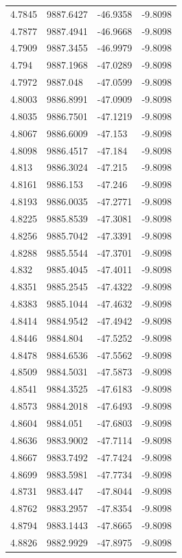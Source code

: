 \begin{table}[H]
\begin{tabular}{llll}
4.7845 & 9887.6427 & -46.9358 & -9.8098 \\
4.7877 & 9887.4941 & -46.9668 & -9.8098 \\
4.7909 & 9887.3455 & -46.9979 & -9.8098 \\
4.794 & 9887.1968 & -47.0289 & -9.8098 \\
4.7972 & 9887.048 & -47.0599 & -9.8098 \\
4.8003 & 9886.8991 & -47.0909 & -9.8098 \\
4.8035 & 9886.7501 & -47.1219 & -9.8098 \\
4.8067 & 9886.6009 & -47.153 & -9.8098 \\
4.8098 & 9886.4517 & -47.184 & -9.8098 \\
4.813 & 9886.3024 & -47.215 & -9.8098 \\
4.8161 & 9886.153 & -47.246 & -9.8098 \\
4.8193 & 9886.0035 & -47.2771 & -9.8098 \\
4.8225 & 9885.8539 & -47.3081 & -9.8098 \\
4.8256 & 9885.7042 & -47.3391 & -9.8098 \\
4.8288 & 9885.5544 & -47.3701 & -9.8098 \\
4.832 & 9885.4045 & -47.4011 & -9.8098 \\
4.8351 & 9885.2545 & -47.4322 & -9.8098 \\
4.8383 & 9885.1044 & -47.4632 & -9.8098 \\
4.8414 & 9884.9542 & -47.4942 & -9.8098 \\
4.8446 & 9884.804 & -47.5252 & -9.8098 \\
4.8478 & 9884.6536 & -47.5562 & -9.8098 \\
4.8509 & 9884.5031 & -47.5873 & -9.8098 \\
4.8541 & 9884.3525 & -47.6183 & -9.8098 \\
4.8573 & 9884.2018 & -47.6493 & -9.8098 \\
4.8604 & 9884.051 & -47.6803 & -9.8098 \\
4.8636 & 9883.9002 & -47.7114 & -9.8098 \\
4.8667 & 9883.7492 & -47.7424 & -9.8098 \\
4.8699 & 9883.5981 & -47.7734 & -9.8098 \\
4.8731 & 9883.447 & -47.8044 & -9.8098 \\
4.8762 & 9883.2957 & -47.8354 & -9.8098 \\
4.8794 & 9883.1443 & -47.8665 & -9.8098 \\
4.8826 & 9882.9929 & -47.8975 & -9.8098 \\

\end{tabular}
\end{table}
